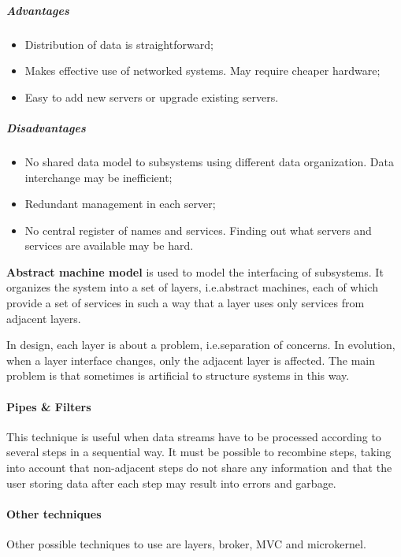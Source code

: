 \subparagraph{Advantages}
\begin{itemize}
\item Distribution of data is straightforward;
\item Makes effective use of networked systems. May require cheaper hardware;
\item Easy to add new servers or upgrade existing servers.
\end{itemize}

\subparagraph{Disadvantages}
\begin{itemize}
\item No shared data model to subsystems using different data organization. Data interchange may be inefficient;
\item Redundant management in each server;
\item No central register of names and services. Finding out what servers and services are available may be hard.
\end{itemize}

\textbf{Abstract machine model} is used to model the interfacing of subsystems. It organizes the system into a set of layers, i.e.\@ abstract machines, each of which provide a set of services in such a way that a layer uses only services from adjacent layers.

In design, each layer is about a problem, i.e.\@ separation of concerns. In evolution, when a layer interface changes, only the adjacent layer is affected. The main problem is that sometimes is artificial to structure systems in this way.

\paragraph{Pipes \& Filters}
This technique is useful when data streams have to be processed according to several steps in a sequential way. It must be possible to recombine steps, taking into account that non-adjacent steps do not share any information and that the user storing data after each step may result into errors and garbage.

\paragraph{Other techniques}
Other possible techniques to use are layers, broker, MVC and microkernel.


